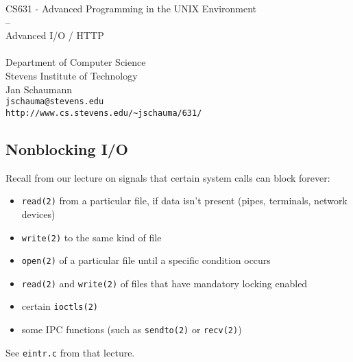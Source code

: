 \documentclass[xga]{xdvislides}
\begin{document}
\setfontphv

\lhead{\slidetitle}
\cfoot{\relax}
\rfoot{\Gray{\today}}

\vspace*{\fill}
\begin{center}
	\Hugesize
		CS631 - Advanced Programming in the UNIX Environment\\
		-- \\
		Advanced I/O / HTTP \\
	\hspace*{5mm}\blueline\\ [1em]
	\Normalsize
		Department of Computer Science\\
		Stevens Institute of Technology\\
		Jan Schaumann\\
		\verb+jschauma@stevens.edu+\\
		\verb+http://www.cs.stevens.edu/~jschauma/631/+
\end{center}
\vspace*{\fill}

\subsection{Nonblocking I/O}
Recall from our lecture on signals that certain system calls can block forever:
\begin{itemize}
	\item {\tt read(2)} from a particular file, if data isn't present (pipes,
		terminals, network devices)
	\item {\tt write(2)} to the same kind of file
	\item {\tt open(2)} of a particular file until a specific condition occurs
	\item {\tt read(2)} and {\tt write(2)} of files that have mandatory
		locking enabled
	\item certain {\tt ioctls(2)}
	\item some IPC functions (such as {\tt sendto(2)} or {\tt recv(2)})
\end{itemize}
\vspace{.25in}
See {\tt eintr.c} from that lecture.
\end{document}
